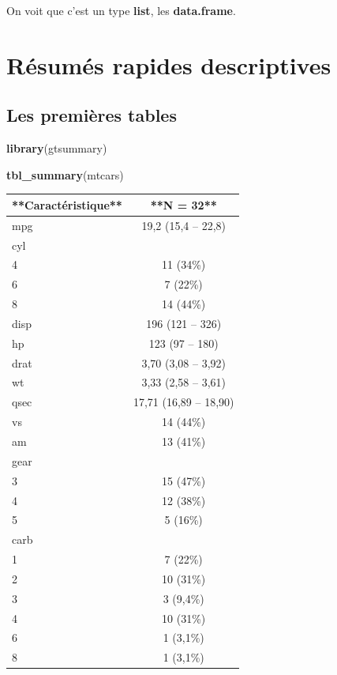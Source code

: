 \documentclass[
]{book}
\newenvironment{Shaded}{\begin{snugshade}}{\end{snugshade}}
\newcommand{\FunctionTok}[1]{\textcolor[rgb]{0.13,0.29,0.53}{\textbf{#1}}}
\newcommand{\NormalTok}[1]{#1}
\begin{document}
On voit que c'est un type \textbf{list}, les \textbf{data.frame}.

\hypertarget{ruxe9sumuxe9s-rapides-descriptives}{%
\chapter{Résumés rapides descriptives}\label{ruxe9sumuxe9s-rapides-descriptives}}

\hypertarget{les-premiuxe8res-tables}{%
\section{Les premières tables}\label{les-premiuxe8res-tables}}

\begin{Shaded}
\begin{Highlighting}[]
\FunctionTok{library}\NormalTok{(gtsummary)}
\end{Highlighting}
\end{Shaded}

\begin{Shaded}
\begin{Highlighting}[]
\FunctionTok{tbl\_summary}\NormalTok{(mtcars)}
\end{Highlighting}
\end{Shaded}

\begin{tabular}{l|c}
\hline
**Caractéristique** & **N = 32**\\
\hline
mpg & 19,2 (15,4 – 22,8)\\
\hline
cyl & \\
\hline
4 & 11 (34\%)\\
\hline
6 & 7 (22\%)\\
\hline
8 & 14 (44\%)\\
\hline
disp & 196 (121 – 326)\\
\hline
hp & 123 (97 – 180)\\
\hline
drat & 3,70 (3,08 – 3,92)\\
\hline
wt & 3,33 (2,58 – 3,61)\\
\hline
qsec & 17,71 (16,89 – 18,90)\\
\hline
vs & 14 (44\%)\\
\hline
am & 13 (41\%)\\
\hline
gear & \\
\hline
3 & 15 (47\%)\\
\hline
4 & 12 (38\%)\\
\hline
5 & 5 (16\%)\\
\hline
carb & \\
\hline
1 & 7 (22\%)\\
\hline
2 & 10 (31\%)\\
\hline
3 & 3 (9,4\%)\\
\hline
4 & 10 (31\%)\\
\hline
6 & 1 (3,1\%)\\
\hline
8 & 1 (3,1\%)\\
\hline
\end{tabular}
\end{document}
